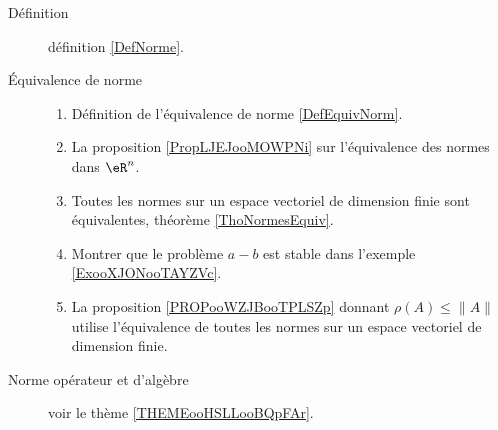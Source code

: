 
      \label{THEMEooUJVXooZdlmHj}


\begin{description}
    \item[Définition] définition \ref{DefNorme}.
    \item[Équivalence de norme] 

        \begin{enumerate}


        \item
            Définition de l'équivalence de norme \ref{DefEquivNorm}.
\item
    La proposition \ref{PropLJEJooMOWPNi} sur l'équivalence des normes dans \( \eR^n\).
\item
    Toutes les normes sur un espace vectoriel de dimension finie sont équivalentes, théorème \ref{ThoNormesEquiv}.
\item
    Montrer que le problème \( a-b\) est stable dans l'exemple \ref{ExooXJONooTAYZVc}.
\item
    La proposition \ref{PROPooWZJBooTPLSZp} donnant \( \rho(A)\leq \| A \|\) utilise l'équivalence de toutes les normes sur un espace vectoriel de dimension finie.
                
        \end{enumerate}

    \item[Norme opérateur et d'algèbre] voir le thème \ref{THEMEooHSLLooBQpFAr}.

\end{description}
